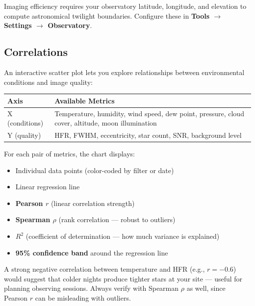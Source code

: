 \documentclass[11pt,a4paper]{article}
\begin{document}
\begin{notebox}
Imaging efficiency requires your observatory latitude, longitude, and elevation to compute astronomical twilight boundaries. Configure these in \textbf{Tools $\rightarrow$ Settings $\rightarrow$ Observatory}.
\end{notebox}

\subsection{Correlations}

An interactive scatter plot lets you explore relationships between environmental conditions and image quality:

\begin{center}
\begin{tabular}{lp{8cm}}
\toprule
\textbf{Axis} & \textbf{Available Metrics} \\
\midrule
X (conditions) & Temperature, humidity, wind speed, dew point, pressure, cloud cover, altitude, moon illumination \\
Y (quality) & HFR, FWHM, eccentricity, star count, SNR, background level \\
\bottomrule
\end{tabular}
\end{center}

For each pair of metrics, the chart displays:
\begin{itemize}
    \item Individual data points (color-coded by filter or date)
    \item Linear regression line
    \item \textbf{Pearson $r$} (linear correlation strength)
    \item \textbf{Spearman $\rho$} (rank correlation --- robust to outliers)
    \item \textbf{$R^2$} (coefficient of determination --- how much variance is explained)
    \item \textbf{95\% confidence band} around the regression line
\end{itemize}

\begin{tipbox}
A strong negative correlation between temperature and HFR (e.g., $r = -0.6$) would suggest that colder nights produce tighter stars at your site --- useful for planning observing sessions. Always verify with Spearman $\rho$ as well, since Pearson $r$ can be misleading with outliers.
\end{tipbox}
\end{document}
